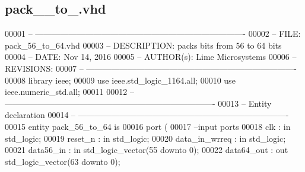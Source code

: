 \subsection{pack\+\_\+\_\+to\+\_.\+vhd}
\label{bit__pack_2synth_2pack__56__to__64_8vhd_source}

\begin{DoxyCode}
00001 \textcolor{keyword}{-- ---------------------------------------------------------------------------- }
00002 \textcolor{keyword}{-- FILE:    pack\_56\_to\_64.vhd}
00003 \textcolor{keyword}{-- DESCRIPTION: packs bits from 56 to 64 bits}
00004 \textcolor{keyword}{-- DATE:    Nov 14, 2016}
00005 \textcolor{keyword}{-- AUTHOR(s):   Lime Microsystems}
00006 \textcolor{keyword}{-- REVISIONS:}
00007 \textcolor{keyword}{-- ---------------------------------------------------------------------------- }
00008 \textcolor{vhdlkeyword}{library }\textcolor{keywordflow}{ieee};
00009 \textcolor{vhdlkeyword}{use }ieee.std\_logic\_1164.\textcolor{keywordflow}{all};
00010 \textcolor{vhdlkeyword}{use }ieee.numeric\_std.\textcolor{keywordflow}{all};
00011 
00012 \textcolor{keyword}{-- ----------------------------------------------------------------------------}
00013 \textcolor{keyword}{-- Entity declaration}
00014 \textcolor{keyword}{-- ----------------------------------------------------------------------------}
00015 \textcolor{keywordflow}{entity }pack_56_to_64 \textcolor{keywordflow}{is}
00016   \textcolor{keywordflow}{port} \textcolor{vhdlchar}{(}
00017 \textcolor{keyword}{      --input ports }
00018       \textcolor{vhdlchar}{clk}               \textcolor{vhdlchar}{:} \textcolor{keywordflow}{in} \textcolor{comment}{std\_logic};
00019       \textcolor{vhdlchar}{reset_n}           \textcolor{vhdlchar}{:} \textcolor{keywordflow}{in} \textcolor{comment}{std\_logic};
00020         \textcolor{vhdlchar}{data_in_wrreq}   \textcolor{vhdlchar}{:} \textcolor{keywordflow}{in} \textcolor{comment}{std\_logic};
00021         \textcolor{vhdlchar}{data56_in}       \textcolor{vhdlchar}{:} \textcolor{keywordflow}{in} \textcolor{comment}{std\_logic\_vector}\textcolor{vhdlchar}{(}\textcolor{vhdllogic}{}\textcolor{vhdllogic}{55} \textcolor{keywordflow}{downto} \textcolor{vhdllogic}{}\textcolor{vhdllogic}{0}\textcolor{vhdlchar}{)};
00022         \textcolor{vhdlchar}{data64_out}      \textcolor{vhdlchar}{:} \textcolor{keywordflow}{out} \textcolor{comment}{std\_logic\_vector}\textcolor{vhdlchar}{(}\textcolor{vhdllogic}{}\textcolor{vhdllogic}{63} \textcolor{keywordflow}{downto} \textcolor{vhdllogic}{}\textcolor{vhdllogic}{0}\textcolor{vhdlchar}{)};

\end{DoxyCode}
